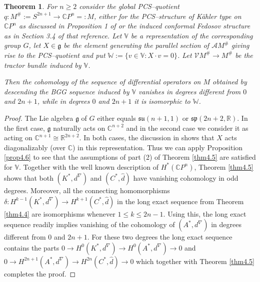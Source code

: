 \documentclass[12pt,a4paper]{amsart}
\def\frak{\mathfrak}
\def\Bbb{\mathbb}
\def\Cal{\mathcal}
\newcounter{theorem}
\numberwithin{theorem}{section}
\newtheorem{thm}[theorem]{Theorem}
\theoremstyle{definition}
\theoremstyle{remark}
\begin{document}
\begin{thm}\label{thm4.6}
  For $n\geq 2$ consider the global PCS--quotient
  $q:M^\#:=S^{2n+1}\to\mathbb CP^n=:M$, either for the PCS--structure
  of K\"ahler type on $\mathbb CP^n$ as discussed in Proposition 1
  of \cite{PCS2} or the induced conformal Fedosov structure as in
  Section 3.4 of that reference. Let $\mathbb V$ be a representation
  of the corresponding group $G$, let $X\in\frak g$ be the element
  generating the parallel section of $\Cal AM^\#$ giving rise to the
  PCS--quotient and put $\Bbb W:=\{v\in\Bbb V:X\cdot v=0\}$. Let $\Cal
  VM^\#\to M^\#$ be the tractor bundle induced by $\Bbb V$.

  Then the cohomology of the sequence of differential operators on $M$
  obtained by descending the BGG sequence induced by $\Bbb V$ vanishes
  in degrees different from $0$ and $2n+1$, while in degrees $0$ and
  $2n+1$ it is isomorphic to $\Bbb W$. 
\end{thm}
\begin{proof}
  The Lie algebra $\frak g$ of $G$ either equals
  $\mathfrak{su}(n+1,1)$ or $\mathfrak{sp}(2n+2,\mathbb R)$. In the
  first case, $\frak g$ naturally acts on $\Bbb C^{n+2}$ and in the
  second case we consider it as acting on $\Bbb C^{n+1}\cong\Bbb
  R^{2n+2}$. In both cases, the discussion in \cite{PCS2} shows that
  $X$ acts diagonalizably (over $\mathbb C$) in this
  representation. Thus we can apply Proposition \ref{prop4.6} to see that
  the assumptions of part (2) of Theorem \ref{thm4.5} are satisfied for
  $\Bbb V$. Together with the well known description of $H^*(\Bbb
  CP^n)$, Theorem \ref{thm4.5} shows that both $(K^*,d^\nabla)$ and
  $(C^*,\hat d)$ have vanishing cohomology in odd degrees. Moreover,
  all the connecting homomorphisms $\delta:H^{k-1}(K^*,d^\nabla)\to
  H^{k+1}(C^*,\hat d)$ in the long exact sequence from Theorem
  \ref{thm4.4} are isomorphisms whenever $1\leq k\leq 2n-1$. Using this,
  the long exact sequence readily implies vanishing of the cohomology of
  $(A^*,d^\nabla)$ in degrees different from $0$ and $2n+1$. For these
  two degrees the long exact sequence contains the parts $0\to
  H^0(K^*,d^\nabla)\to H^0(A^*,d^\nabla)\to 0$ and $0\to
  H^{2n+1}(A^*,d^\nabla)\to H^{2n}(C^*,\hat d)\to 0$ which together
  with Theorem \ref{thm4.5} completes the proof.
\end{proof}
\end{document}
